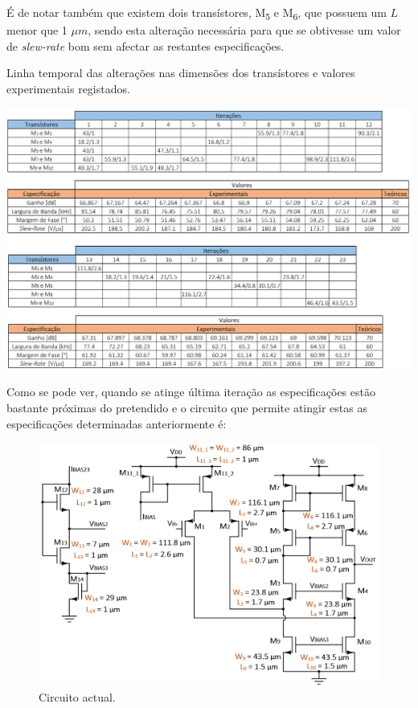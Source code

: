\documentclass[11pt]{article}
\numberwithin{equation}{section}
\begin{document}
É de notar também que existem dois transístores, M\textsubscript{5} e M\textsubscript{6}, que possuem um $L$ menor que 1 $\mu m$, sendo esta alteração necessária para que se obtivesse um valor de \textit{slew-rate} bom sem afectar as restantes especificações.

\begin{table}[H]
	\centering
	\caption{Linha temporal das alterações nas dimensões dos transístores e valores experimentais registados.}
	\vspace{-1.5mm}
	\includegraphics[keepaspectratio=true, scale=0.40]{teoricas/tabelaF1}
\end{table}

Como se pode ver, quando se atinge última iteração as especificações estão bastante próximas do pretendido e o circuito que permite atingir estas as especificações determinadas anteriormente é:

\begin{figure}[H]
	\centering
	\includegraphics[keepaspectratio=true, scale=0.70]{teoricas/ajustesF1}
	\vspace{-0.5em}
	\caption{Circuito actual.}
	\vspace{-0.8em}
\end{figure}
\end{document}
